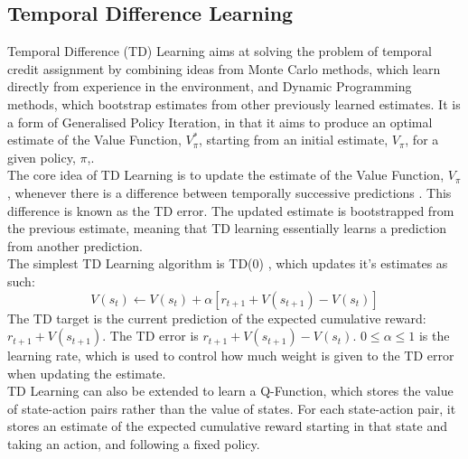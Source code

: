 \subsection{Temporal Difference Learning}
Temporal Difference (TD) Learning \cite{10.5555/911176, 5392560, 5391906} aims at solving the problem of temporal credit assignment by combining ideas from Monte Carlo methods, which learn directly from experience in the environment, and Dynamic Programming methods, which bootstrap estimates from other previously learned estimates. It is a form of Generalised Policy Iteration, in that it aims to produce an optimal estimate of the Value Function, $V_\pi^*$, starting from an initial estimate, $V_\pi$, for a given policy, $\pi$,\cite{Sutton1998}.
\\The core idea of TD Learning is to update the estimate of the Value Function, $V_\pi$, whenever there is a difference between temporally successive predictions \cite{Sutton:1988}. This difference is known as the TD error. The updated estimate is bootstrapped from the previous estimate, meaning that TD learning essentially learns a prediction from another prediction.
\\The simplest TD Learning algorithm is TD(0) \cite{Sutton:1988}, which updates it's estimates as such:
\begin{equation}
\label{eqn:td0update}
V(s_t) \leftarrow V(s_t) + \alpha[r_{t+1} + V(s_{t+1}) - V(s_t)]
\end{equation}
The TD target is the current prediction of the expected cumulative reward: $r_{t+1} + V(s_{t+1})$. The TD error is $r_{t+1} + V(s_{t+1}) - V(s_t)$.
$0 \le \alpha \le 1$ is the learning rate, which is used to control how much weight is given to the TD error when updating the estimate. 
\\TD Learning can also be extended to learn a Q-Function, which stores the value of state-action pairs rather than the value of states. For each state-action pair, it stores an estimate of the expected cumulative reward starting in that state and taking an action, and following a fixed policy.

